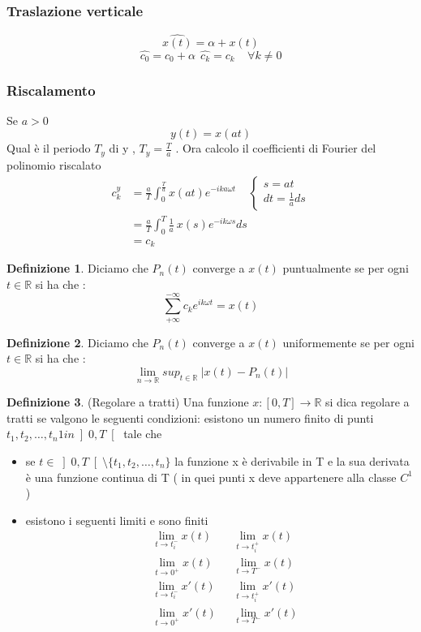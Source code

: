 \documentclass{article}
\theoremstyle{definition}
\newtheorem*{definizione}{Definizione}
\newcommand{\R}{\mathbb{R}}
\newcommand{\inT}{\int_{0}^{T} }
\begin{document}
\subsubsection{Traslazione verticale}
$$\hat{x(t)}=\alpha+x(t)$$
$$\hat{c_0}=c_0+\alpha \ \ \hat{c_k}=c_k\ \ \ \  \  \forall k \neq 0$$
\subsubsection{Riscalamento}
Se $ a > 0$ 
$$y(t)=x(at)$$
Qual è il periodo $T_y$ di y , $T_y=\frac{T}{a}$ . Ora calcolo il coefficienti di Fourier del polinomio riscalato 
\begin{align*}
c^y_k&=\frac{a}{T} \int_{0}^{\frac{T}{a}}x(at)e^{-ika\omega t}  \ \ \ \ \ \begin{cases}
	s=at \\
	dt=\frac{1}{a}ds
\end{cases}\\ 
&=\frac{a}{T} \inT \frac{1}{a} \ x(s)e^{-ik\omega s} ds \\
&=c_k
\end{align*}
\begin{definizione}
	Diciamo che $P_n(t)$ converge a $x(t)$ puntualmente se per ogni $t \in \R$ si ha che :
	$$\sum_{+\infty}^{-\infty} c_k e^{ik\omega t}=x(t)$$
\end{definizione}
\begin{definizione}
	Diciamo che $P_n(t)$ converge a $x(t)$ uniformemente se per ogni $t \in \R$ si ha che :
	$$\lim_{n \rightarrow \R} sup_{t \in \R }\ |x(t)-P_n(t)|$$
\end{definizione}
\begin{definizione}(Regolare a tratti) \newline
	Una funzione $x:\left[0,T\right]\rightarrow \R$ si dica regolare a tratti se valgono le seguenti condizioni: esistono un numero finito di punti $t_1,t_2,\dots,t_n 1in \left]0,T\right[$ tale che  
	\begin{itemize}
\item se $t \in  \left]0,T\right[ \setminus \{t_1,t_2,\dots,t_n\}$ la funzione x è derivabile in T e la sua derivata è una funzione continua di T ( in quei punti x deve appartenere alla classe $C^1$)
\item esistono i seguenti limiti e sono finiti
\begin{align*}
&\lim_{t \rightarrow t_i^-} x(t)\ \ & \  \lim_{t \rightarrow t_i^+} x(t)\\
&\lim_{t \rightarrow 0^+} x(t)\ \ &\  \lim_{t \rightarrow T^-} x(t)\\
&\lim_{t \rightarrow t_i^-} x'(t)\ \ & \  \lim_{t \rightarrow t_i^+} x'(t)\\
&\lim_{t \rightarrow 0^+} x'(t)\ \ & \  \lim_{t \rightarrow T^-} x'(t)\\
\end{align*}
	\end{itemize}
\end{definizione}
\end{document}
